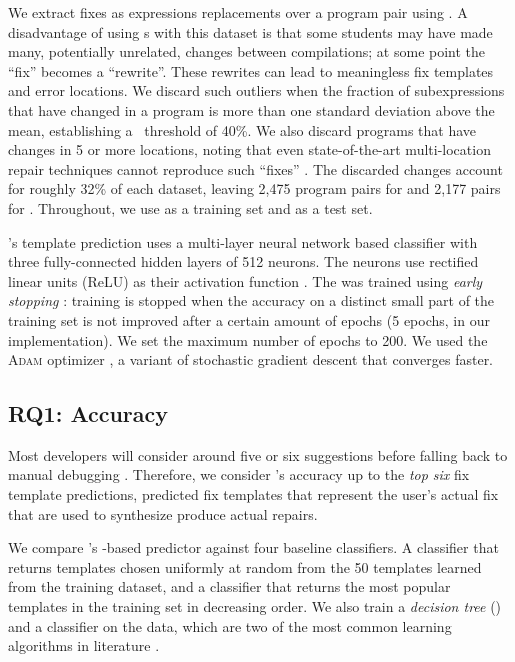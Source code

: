 %
We extract fixes as expressions replacements over a program pair using \diffsym.
A disadvantage of using \diffsym s with this dataset is that some students may
have made many, potentially unrelated, changes between compilations; at some
point the ``fix'' becomes a ``rewrite''. These rewrites can lead to meaningless
fix templates and error locations. We discard such outliers when the fraction of
subexpressions that have changed in a program is more than one standard
deviation above the mean, establishing a \diffsym\ threshold of 40\%. We also
discard programs that have changes in 5 or more locations, noting that even
state-of-the-art multi-location repair techniques cannot reproduce such
``fixes'' \citep{Saha_2019}. The discarded changes account for roughly 32\% of
each dataset, leaving 2,475 program pairs for \SPRING and 2,177 pairs for \FALL.
Throughout, we use \SPRING as a training set and \FALL as a test set.

%
\toolname's template prediction uses a multi-layer neural network \dnn based
classifier with three fully-connected hidden layers of 512 neurons. The neurons
use rectified linear units (ReLU) as their activation function
\citep{Nair2010-xg}.
%
The \dnn was trained using \emph{early stopping} \citep{Hastie2009-bn}: training
is stopped when the accuracy on a distinct small part of the training set is not
improved after a certain amount of epochs (5 epochs, in our implementation).
%
We set the maximum number of epochs to 200.
%
We used the \textsc{Adam} optimizer \citep{Kingma2014-ng},
a variant of stochastic gradient descent that converges faster.

\subsection{RQ1: Accuracy}
\label{sec:eval:accuracy}

Most developers will consider around five or six suggestions before falling back
to manual debugging \citep{Kochhar2016-oc,Parnin2011-ce}.
%
Therefore, we consider \toolname's accuracy up to the \emph{top six} fix
template predictions, \ie predicted fix templates that represent the user's
actual fix that are used to synthesize produce actual repairs.

%
We compare \toolname's \dnn-based predictor against four baseline classifiers. A
\random classifier that returns templates chosen uniformly at random from the 50
templates learned from the \SPRING training dataset, and a \popular classifier
that returns the most popular templates in the training set in decreasing order.
We also train a \textit{decision tree} (\trees) and a \svm classifier on the
\SPRING data, which are two of the most common learning algorithms in literature
\citep{Hastie2009-bn}.

